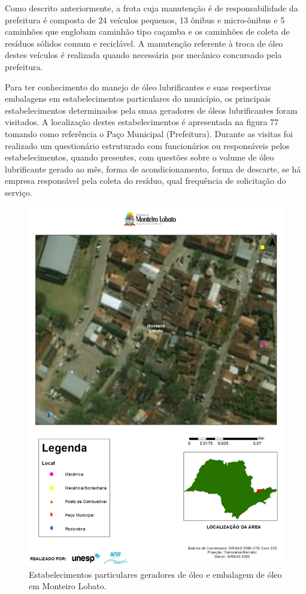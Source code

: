 \begin{description}
	Como descrito anteriormente, a frota cuja manutenção é de responsabilidade da prefeitura é composta de 24 veículos pequenos, 13 	ônibus e micro-ônibus e 5 caminhões que englobam caminhão tipo caçamba e os caminhões de coleta de resíduos sólidos comum e reciclável. A manutenção referente à troca de óleo destes veículos é realizada quando necessária por mecânico concursado pela prefeitura.
	
	Para ter conhecimento do manejo de óleo lubrificantes e suas respectivas embalagens em estabelecimentos particulares do município, os principais estabelecimentos determinados pela \gls{smaa} geradores de óleos lubrificantes foram visitados. A localização destes estabelecimentos é apresentada na figura 77 tomando como referência o Paço Municipal (Prefeitura). Durante as visitas foi realizado um questionário estruturado com funcionários ou responsáveis pelos estabelecimentos, quando presentes, com questões sobre o volume de óleo lubrificante gerado ao mês, forma de acondicionamento, forma de descarte, se há empresa responsável pela coleta do resíduo, qual frequência de solicitação do serviço.
	
	\begin{figure}
		\centering
		\includegraphics[width=1\linewidth]{produtos/prodtres/image093}
		\caption{Estabelecimentos particulares geradores de óleo e embalagem de óleo em Monteiro Lobato.}
		\label{fig:image093}
	\end{figure}
	

\end{description}
